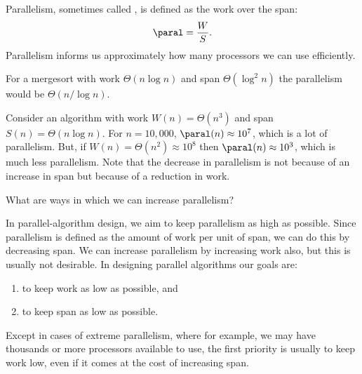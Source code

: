\begin{definition}
Parallelism, sometimes called , is
defined as the work over the span:
\[ 
\paral = \frac{W}{S}.
\]
%
Parallelism informs us approximately how many processors we can use
efficiently.
\end{definition}

\begin{example}
For a mergesort with work $\Theta(n \log n)$ and span
$\Theta(\log^2 n)$ the parallelism would be $\Theta(n/\log
n)$.
\end{example}

\begin{example}
Consider an algorithm with work $W(n) = \Theta(n^3)$ and span 
$S(n) = \Theta(n \log n)$.
%
For $n = 10,000$, $\paral(n) \approx 10^7$, which is a lot of
parallelism.  
%
But, if $W(n) = \Theta(n^2) \approx 10^8$ then
$\paral(n) \approx 10^3$, which is much less parallelism. 
%
Note that the decrease in parallelism is not because of an increase in
span but because of a reduction in work.
\end{example}

\begin{teachask}
What are ways in which we can increase parallelism?
\end{teachask}



\begin{gram}

In parallel-algorithm design, we aim to keep parallelism as high
as possible.
%
Since parallelism is defined as the amount of work per unit of span, 
we can do this by decreasing span.
%
We can increase parallelism by increasing work also, but this is
usually not desirable.
%
In designing parallel algorithms our goals are: 

\begin{enumerate}
\item   to keep work as low as possible, and
\item   to keep span as low as possible.
\end{enumerate}

Except in cases of extreme parallelism, where for example, we may have
thousands or more processors available to use, the first priority is
usually to keep work low, even if it comes at the cost of increasing
span.

\end{gram}

